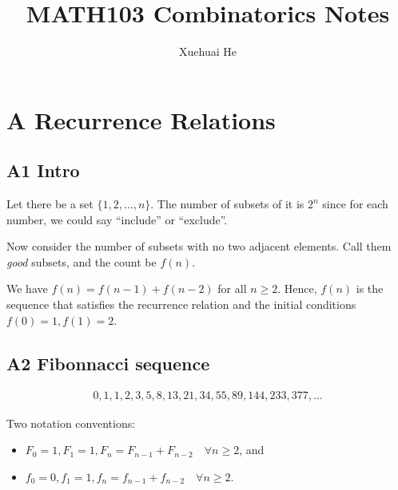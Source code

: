 \documentclass[12pt]{article}
\begin{document}
\title{MATH103 Combinatorics Notes}
\author{Xuehuai He}
\maketitle

\hypertarget{toc}{}
{\parskip=0.05in
\tableofcontents}


\newpage
\pagestyle{updated}
\section{A Recurrence Relations}
\subsection{A1 Intro}
\rmk Let there be a set $\{1,2,\dots,n\}$. The number of subsets of it is $2^n$ since for each number, we could say ``include'' or ``exclude''.

\eg Now consider the number of subsets with no two adjacent elements. Call them \textit{good} subsets, and the count be $f(n)$.


We have $f(n)=f(n-1)+f(n-2)$ for all $n\geq 2$. Hence, $f(n)$ is the sequence that satisfies the recurrence relation and the initial conditions $f(0)=1, f(1)=2$.

\subsection{A2 Fibonnacci sequence}
\begin{align*}
    0,1,1,2,3,5,8,13,21,34,55,89,144,233,377,\dots
\end{align*}

\rmk Two notation conventions: \begin{itemize}
    \item $F_0=1, F_1=1, F_n=F_{n-1}+F_{n-2}\quad \forall n\geq 2$, and
    \item $f_0=0, f_1=1, f_n=f_{n-1}+f_{n-2}\quad \forall n\geq 2$.
\end{itemize}
\end{document}
